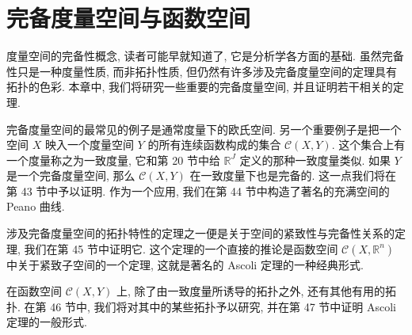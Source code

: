 \documentclass[../main.tex]{subfiles}
\begin{document}
\chapter{完备度量空间与函数空间}\label{chapter:ch07}

度量空间的完备性概念, 读者可能早就知道了, 它是分析学各方面的基础. 虽然完备性只是一种度量性质, 而非拓扑性质, 但仍然有许多涉及完备度量空间的定理具有拓扑的色彩. 本章中, 我们将研究一些重要的完备度量空间, 并且证明若干相关的定理.

完备度量空间的最常见的例子是通常度量下的欧氏空间. 另一个重要例子是把一个空间 $X$ 映入一个度量空间 $Y$ 的所有连续函数构成的集合 $\mathcal{C}(X,Y)$. 这个集合上有一个度量称之为一致度量, 它和第 20 节中给 $\mathbb{R}^J$ 定义的那种一致度量类似. 如果 $Y$ 是一个完备度量空间, 那么 $\mathcal{C}(X,Y)$ 在一致度量下也是完备的. 这一点我们将在第 43 节中予以证明. 作为一个应用, 我们在第 44 节中构造了著名的充满空间的 Peano 曲线.

涉及完备度量空间的拓扑特性的定理之一便是关于空间的紧致性与完备性关系的定理, 我们在第 45 节中证明它. 这个定理的一个直接的推论是函数空间 $\mathcal{C}(X,\mathbb{R}^n)$ 中关于紧致子空间的一个定理, 这就是著名的 Ascoli 定理的一种经典形式.

在函数空间 $\mathcal{C}(X,Y)$ 上, 除了由一致度量所诱导的拓扑之外, 还有其他有用的拓扑. 在第 46 节中, 我们将对其中的某些拓扑予以研究, 并在第 47 节中证明 Ascoli 定理的一般形式.






\end{document}
